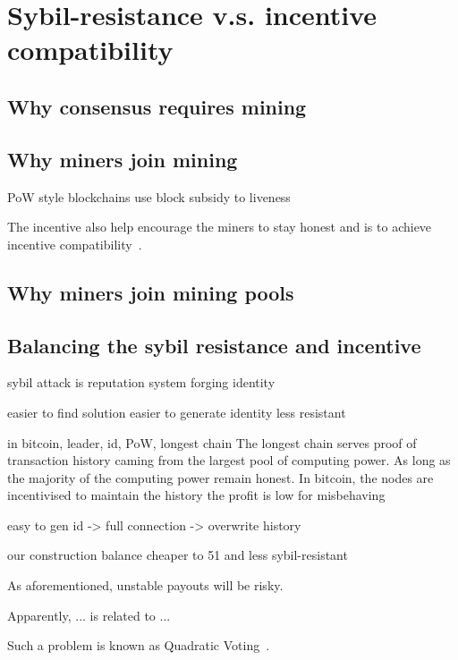 \section{Sybil-resistance v.s. incentive compatibility}

\subsection{Why consensus requires mining}



\subsection{Why miners join mining}


PoW style blockchains use block subsidy to 
liveness



The incentive also help encourage the miners to stay honest and is to achieve incentive compatibility~\cite{}.

\subsection{Why miners join mining pools}



\subsection{Balancing the sybil resistance and incentive}



sybil attack is 
reputation system
forging identity

easier to find solution
easier to generate identity
less resistant

in bitcoin, leader, id, PoW, longest chain
The longest chain serves proof of transaction history caming from the largest pool of computing power.
As long as the majority of the computing power remain honest.
In bitcoin, the nodes are incentivised to maintain the history
the profit is low for misbehaving


easy to gen id -> full connection -> overwrite history


our construction
balance
cheaper to 51 and less sybil-resistant


As aforementioned, unstable payouts will be risky.


Apparently, 
... is related to ...

Such a problem is known as Quadratic Voting~\cite{lalley2018quadratic}.
